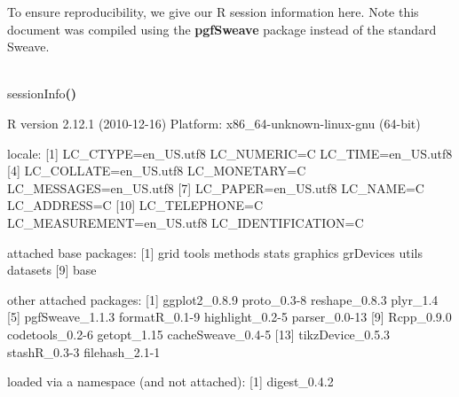 \documentclass[english]{article}
\newenvironment{dummy}{\par}{\par}
\newcommand{\hlfunctioncall}[1]{\textcolor[rgb]{1,0,0}{#1}}%
\newcommand{\hlkeyword}[1]{\textcolor[rgb]{0,0,0}{\textbf{#1}}}%
\newcommand{\hlprompt}[1]{\textcolor[rgb]{0,0,0}{#1}}%
\newcommand{\hlstd}[1]{\textcolor[rgb]{0,0,0}{#1}}%
\begin{document}
To ensure reproducibility, we give our R session information here.
Note this document was compiled using the \textbf{pgfSweave} package
\citep{pgfSweave} instead of the standard Sweave.
\begin{dummy}
\hspace*{\fill}\\
\hlstd{}\ttfamily\noindent
\hlprompt{\usebox{\hlnormalsizeboxgreaterthan}{\ }}\hlfunctioncall{sessionInfo}\hlkeyword{(}\hlkeyword{)}\mbox{}
\normalfont
\hspace*{\fill}\\
\hlstd{}\begin{Schunk}
\begin{Soutput}
R version 2.12.1 (2010-12-16)
Platform: x86_64-unknown-linux-gnu (64-bit)

locale:
 [1] LC_CTYPE=en_US.utf8       LC_NUMERIC=C              LC_TIME=en_US.utf8       
 [4] LC_COLLATE=en_US.utf8     LC_MONETARY=C             LC_MESSAGES=en_US.utf8   
 [7] LC_PAPER=en_US.utf8       LC_NAME=C                 LC_ADDRESS=C             
[10] LC_TELEPHONE=C            LC_MEASUREMENT=en_US.utf8 LC_IDENTIFICATION=C      

attached base packages:
[1] grid      tools     methods   stats     graphics  grDevices utils     datasets 
[9] base     

other attached packages:
 [1] ggplot2_0.8.9     proto_0.3-8       reshape_0.8.3     plyr_1.4         
 [5] pgfSweave_1.1.3   formatR_0.1-9     highlight_0.2-5   parser_0.0-13    
 [9] Rcpp_0.9.0        codetools_0.2-6   getopt_1.15       cacheSweave_0.4-5
[13] tikzDevice_0.5.3  stashR_0.3-3      filehash_2.1-1   

loaded via a namespace (and not attached):
[1] digest_0.4.2
\end{Soutput}

\end{Schunk}
\end{dummy}
\end{document}

